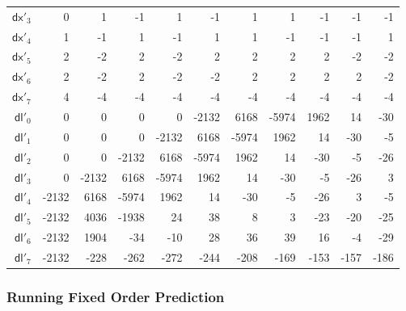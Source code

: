 \begin{table}[h]
{\begin{tabular}{r|rrrrrrrrrr}
      $\textsf{dx}'_{3}$ & 0 & 1 & -1 & 1 & -1 & 1 & 1 & -1 & -1 & -1 \\
      $\textsf{dx}'_{4}$ & 1 & -1 & 1 & -1 & 1 & 1 & -1 & -1 & -1 & 1 \\
      $\textsf{dx}'_{5}$ & 2 & -2 & 2 & -2 & 2 & 2 & 2 & 2 & -2 & -2 \\
      $\textsf{dx}'_{6}$ & 2 & -2 & 2 & -2 & -2 & 2 & 2 & 2 & 2 & -2 \\
      $\textsf{dx}'_{7}$ & 4 & -4 & -4 & -4 & -4 & -4 & -4 & -4 & -4 & -4 \\
      \hline
      $\textsf{dl}'_{0}$ & 0 & 0 & 0 & 0 & -2132 & 6168 & -5974 & 1962 & 14 & -30 \\
      $\textsf{dl}'_{1}$ & 0 & 0 & 0 & -2132 & 6168 & -5974 & 1962 & 14 & -30 & -5 \\
      $\textsf{dl}'_{2}$ & 0 & 0 & -2132 & 6168 & -5974 & 1962 & 14 & -30 & -5 & -26 \\
      $\textsf{dl}'_{3}$ & 0 & -2132 & 6168 & -5974 & 1962 & 14 & -30 & -5 & -26 & 3 \\
      $\textsf{dl}'_{4}$ & -2132 & 6168 & -5974 & 1962 & 14 & -30 & -5 & -26 & 3 & -5 \\
      $\textsf{dl}'_{5}$ & -2132 & 4036 & -1938 & 24 & 38 & 8 & 3 & -23 & -20 & -25 \\
      $\textsf{dl}'_{6}$ & -2132 & 1904 & -34 & -10 & 28 & 36 & 39 & 16 & -4 & -29 \\
      $\textsf{dl}'_{7}$ & -2132 & -228 & -262 & -272 & -244 & -208 & -169 & -153 & -157 & -186 \\
    \end{tabular}
  }
\end{table}

\clearpage

\subsubsection{Running Fixed Order Prediction}
\label{tta:fixedprediction}
{
  
}

